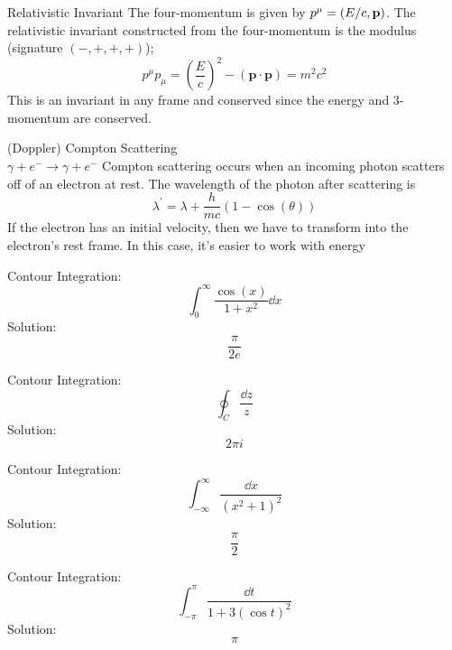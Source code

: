 \documentclass[avery5371,grid]{flashcards}
\begin{document}
\begin{flashcard}[Definition]{Relativistic Invariant}
	The {four-momentum} is given by $p^\mu = \qty(E/c,\mathbf{p})$. The relativistic invariant constructed from the four-momentum is the modulus (signature $(-,+,+,+)$);
	\begin{equation*}
		p^\mu p_{\mu} = (\frac{E}{c})^2 - (\mathbf{p}\cdot\mathbf{p}) = m^2 c^2
	\end{equation*}
	This is an invariant in any frame and conserved since the energy and 3-momentum are conserved.
\end{flashcard}

\begin{flashcard}[Definition]{(Doppler) Compton Scattering\\ $\gamma + e^{-} \to \gamma + e^{-}$}
	Compton scattering occurs when an incoming photon scatters off of an electron at rest. The wavelength of the photon after scattering is
	\begin{equation*}
		\lambda^\prime = \lambda + \frac{h}{mc}(1-\cos(\theta))
	\end{equation*}
	If the electron has an initial velocity, then we have to transform into the electron's rest frame. In this case, it's easier to work with energy
\end{flashcard}

\cardfrontfoot{\ }

\begin{flashcard}[Problem]{Contour Integration: $$\int_0^\infty \frac{\cos(x)}{1+x^2}\dd x$$}
	Solution:
	$$\frac{\pi}{2e}$$
\end{flashcard}

\begin{flashcard}[Problem]{Contour Integration: $$\oint_C \frac{\dd z}{z}$$}
	Solution: $$2\pi i$$
\end{flashcard}

\begin{flashcard}[Problem]{Contour Integration: $$\int_{-\infty}^{\infty}\frac{\dd x}{(x^2+1)^2}$$}
	Solution: $$\frac{\pi}{2}$$
\end{flashcard}

\begin{flashcard}[Problem]{Contour Integration: $$\int_{-\pi}^{\pi} \frac{\dd t}{1+3(\cos t)^2}$$}
	Solution: $$\pi$$
\end{flashcard}
\end{document}
